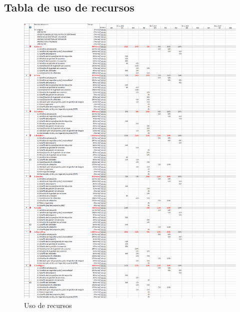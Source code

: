 \subsection{Tabla de uso de recursos}
\begin{figure}[H]
	\centering
	\includegraphics[width=\textwidth]{images/recursos.png}
	\caption{Uso de recursos}
\end{figure}
